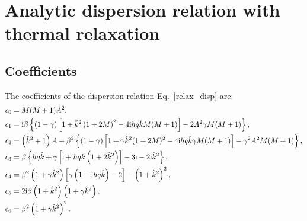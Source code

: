 \section{Analytic dispersion relation
with thermal relaxation}
\subsection{Coefficients}\label{relax_coeff}
The coefficients of the dispersion relation Eq.\ \ref{relax_disp} are:
\begin{subequations}\label{coeffs}\begin{align}
  &c_0 = M(M+1)A^2,\\
  &c_1 = \mathrm{i}\beta\left\{\left(1-\gamma\right)\left[1 +
      \hat{k}^2\left(1+2M\right)^2 - 4 \mathrm{i} h q\hat{k} M (M+1)\right] 
    - 2A^2\gamma M (M+1)\right\},\\
  &c_2 = \left(\hat{k}^2 + 1\right)A + \beta^2\left\{(1-\gamma)\left[1
      + \gamma \hat{k}^2(1+2M)^2 - 4\mathrm{i} h q \hat{k} \gamma M(M+1)
    \right]
    -\gamma^2 A^2 M(M+1)
  \right\},\\
  &c_3 = \beta\left\{h q \hat{k} + \gamma \left[\mathrm{i} + h q
      k \left(1+2\hat{k}^2\right)\right] - 3\mathrm{i} - 2\mathrm{i}
    \hat{k}^2\right\},\\
  &c_4 =
  \beta^2\left(1+\gamma\hat{k}^2\right)\left[\gamma\left(1-\mathrm{i} h q
    \hat{k}\right)-2\right] - \left(1+\hat{k}^2\right)^2,\\
&c_5 = 2\mathrm{i}\beta\left(1+\hat{k}^2\right)\left(1+\gamma\hat{k}^2\right),\\
&c_6 = \beta^2\left(1+\gamma\hat{k}^2\right)^2.
\end{align}\end{subequations}

